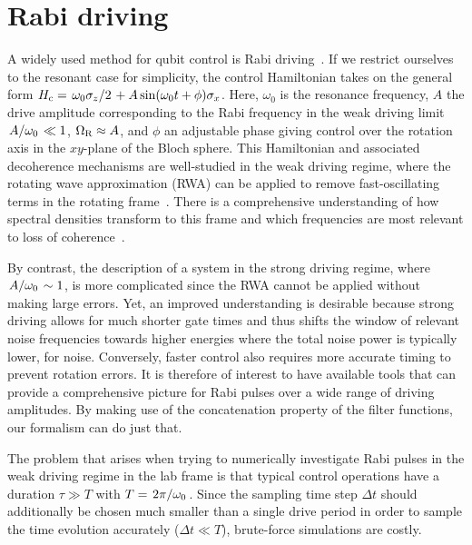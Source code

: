 \section{Rabi driving}\label{sec:ff:examples:rabi_driving}
A widely used method for qubit control is Rabi driving~\cite{Wallraff2004,Barends2014,Soare2014,Veldhorst2014}.
If we restrict ourselves to the resonant case for simplicity, the control Hamiltonian takes on the general form $\Hc = \flatfrac{\omega_0\pz}{2} + A\sin(\omega_0 t + \phi)\px$.
Here, $\omega_0$ is the resonance frequency, $A$ the drive amplitude corresponding to the Rabi frequency in the weak driving limit $\flatfrac{A}{\omega_\mr{0}}\ll 1$, $\Omega_{\mathrm{R}}\approx A$, and $\phi$ an adjustable phase giving control over the rotation axis in the $xy$-plane of the Bloch sphere.
This Hamiltonian and associated decoherence mechanisms are well-studied in the weak driving regime, where the rotating wave approximation (RWA) can be applied to remove fast-oscillating terms in the rotating frame~\cite{Jaynes1963,Gerry2008}.
There is a comprehensive understanding of how spectral densities transform to this frame and which frequencies are most relevant to loss of coherence~\cite{Yan2013}.

By contrast, the description of a system in the strong driving regime, where $\flatfrac{A}{\omega_0}\sim 1$, is more complicated since the RWA cannot be applied without making large errors.
Yet, an improved understanding is desirable because strong driving allows for much shorter gate times and thus shifts the window of relevant noise frequencies towards higher energies where the total noise power is typically lower, \eg for \oneoverf noise.
Conversely, faster control also requires more accurate timing to prevent rotation errors.
It is therefore of interest to have available tools that can provide a comprehensive picture for Rabi pulses over a wide range of driving amplitudes.
By making use of the concatenation property of the filter functions, our formalism can do just that.

The problem that arises when trying to numerically investigate Rabi pulses in the weak driving regime in the lab frame is that typical control operations have a duration $\tau\gg T$ with $T = \flatfrac{2\pi}{\omega_0}$.
Since the sampling time step $\Delta t$ should additionally be chosen much smaller than a single drive period in order to sample the time evolution accurately ($\Delta t\ll T$), brute-force simulations are costly.

